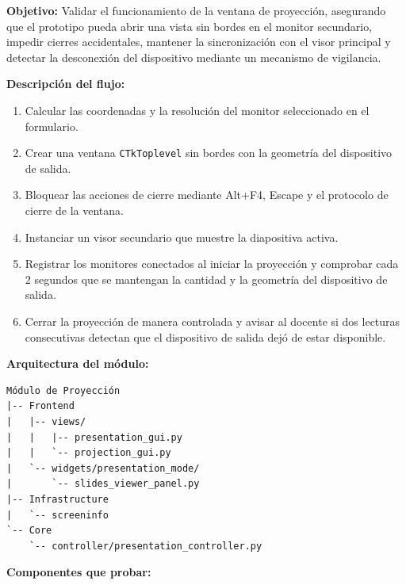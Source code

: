 \documentclass[11pt]{article}
\begin{document}
\textbf{Objetivo:} Validar el funcionamiento de la ventana de proyección, asegurando que el prototipo pueda abrir una vista sin bordes en el monitor secundario, impedir cierres accidentales, mantener la sincronización con el visor principal y detectar la desconexión del dispositivo mediante un mecanismo de vigilancia.

\textbf{Descripción del flujo:}
\begin{enumerate}
    \item Calcular las coordenadas y la resolución del monitor seleccionado en el formulario.
    \item Crear una ventana \texttt{CTkToplevel} sin bordes con la geometría del dispositivo de salida.
    \item Bloquear las acciones de cierre mediante Alt+F4, Escape y el protocolo de cierre de la ventana.
    \item Instanciar un visor secundario que muestre la diapositiva activa.
    \item Registrar los monitores conectados al iniciar la proyección y comprobar cada 2 segundos que se mantengan la cantidad y la geometría del dispositivo de salida.
    \item Cerrar la proyección de manera controlada y avisar al docente si dos lecturas consecutivas detectan que el dispositivo de salida dejó de estar disponible.
\end{enumerate}

\textbf{Arquitectura del módulo:}
\begin{verbatim}
Módulo de Proyección
|-- Frontend
|   |-- views/
|   |   |-- presentation_gui.py
|   |   `-- projection_gui.py
|   `-- widgets/presentation_mode/
|       `-- slides_viewer_panel.py
|-- Infrastructure
|   `-- screeninfo
`-- Core
    `-- controller/presentation_controller.py
\end{verbatim}

\clearpage
\textbf{Componentes que probar:}
\end{document}
